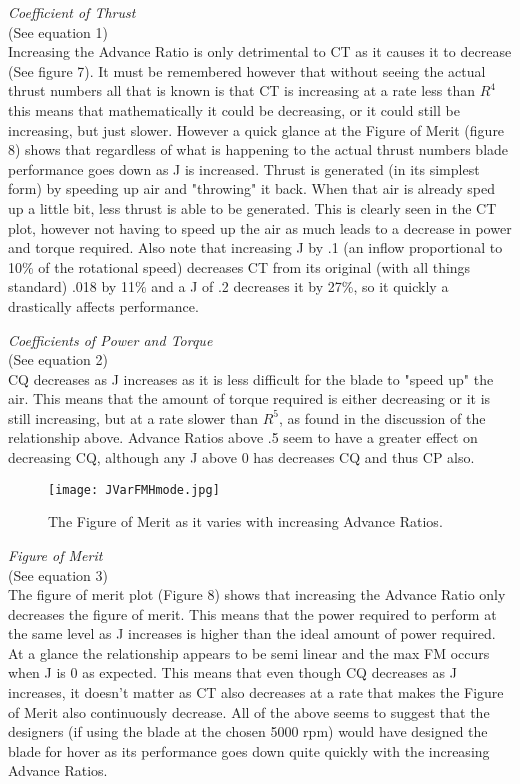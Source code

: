 \documentclass[12pt]{texmemo} %
\begin{document}
\textit{Coefficient of Thrust}\\
(See equation 1)\\
Increasing the Advance Ratio is only detrimental to CT as it causes it to decrease (See figure 7). It must be remembered however that without seeing the actual thrust numbers all that is known is that CT is increasing at a rate less than $R^4$ this means that mathematically it could be decreasing, or it could still be increasing, but just slower. However a quick glance at the Figure of Merit (figure 8) shows that regardless of what is happening to the actual thrust numbers blade performance goes down as J is increased. Thrust is generated (in its simplest form) by speeding up air and "throwing" it back. When that air is already sped up a little bit, less thrust is able to be generated. This is clearly seen in the CT plot, however not having to speed up the air as much leads to a decrease in power and torque required. Also note that increasing J by .1 (an inflow proportional to 10\% of the rotational speed) decreases CT from its original (with all things standard) .018 by 11\% and a J of .2 decreases it by 27\%, so it quickly a drastically affects performance.

\vspace{5mm} %

\textit{Coefficients of Power and Torque}\\ 
(See equation 2)\\
CQ decreases as J increases as it is less difficult for the blade to "speed up" the air. This means that the amount of torque required is either decreasing or it is still increasing, but at a rate slower than $R^5$, as found in the discussion of the relationship above. Advance Ratios above .5 seem to have a greater effect on decreasing CQ, although any J above 0 has decreases CQ and thus CP also.

\vspace{5mm} %

\begin{figure}[h]
\centering
\texttt{[image: JVarFMHmode.jpg]}
\caption{The Figure of Merit as it varies with increasing Advance Ratios.}
\end{figure}
\vspace{5mm} %

\textit{Figure of Merit} \\
(See equation 3)\\
The figure of merit plot (Figure 8) shows that increasing the Advance Ratio only decreases the figure of merit. This means that the power required to perform at the same level as J increases is higher than the ideal amount of power required. At a glance the relationship appears to be semi linear and the max FM occurs when J is 0 as expected. This means that even though CQ decreases as J increases, it doesn't matter as CT also decreases at a rate that makes the Figure of Merit also continuously decrease. All of the above seems to suggest that the designers (if using the blade at the chosen 5000 rpm) would have designed the blade for hover as its performance goes down quite quickly with the increasing Advance Ratios.
\end{document}
